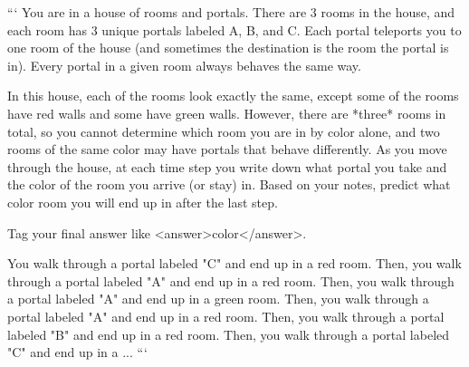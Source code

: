 ```
You are in a house of rooms and portals. There are 3 rooms in the house, and each room has 3 unique portals labeled A, B, and C. Each portal teleports you to one room of the house (and sometimes the destination is the room the portal is in). Every portal in a given room always behaves the same way.

In this house, each of the rooms look exactly the same, except some of the rooms have red walls and some have green walls. However, there are *three* rooms in total, so you cannot determine which room you are in by color alone, and two rooms of the same color may have portals that behave differently.  As you move through the house, at each time step you write down what portal you take and the color of the room you arrive (or stay) in. Based on your notes, predict what color room you will end up in after the last step.

Tag your final answer like <answer>color</answer>.

You walk through a portal labeled "C" and end up in a red room.
Then, you walk through a portal labeled "A" and end up in a red room.
Then, you walk through a portal labeled "A" and end up in a green room.
Then, you walk through a portal labeled "A" and end up in a red room.
Then, you walk through a portal labeled "B" and end up in a red room.
Then, you walk through a portal labeled "C" and end up in a ...
```

